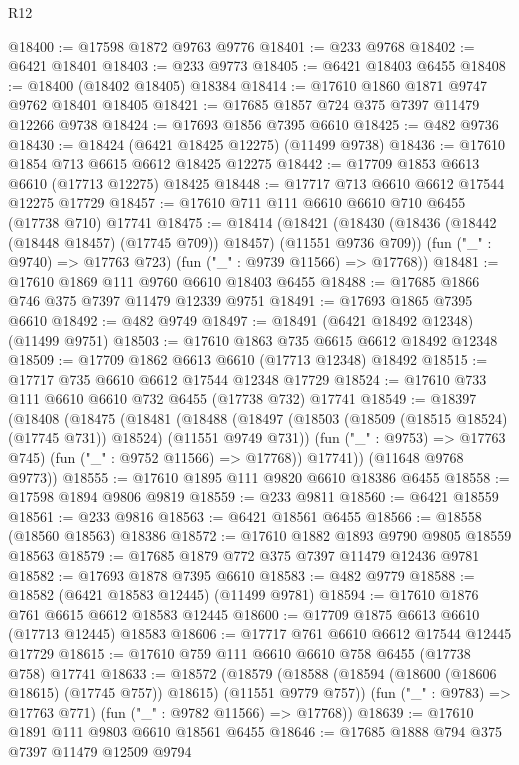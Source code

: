 \begin{lexlean}{R12}
\begin{coremodule}
{{{{{{{{{{{{{{{{{{{{{{{{{{{{{{{{{{{{{{{{{{{{{{{{{{{{{{{{{{{{{{{{{{{{{{{{{{{{{{{{{{@18400 := @17598 @1872 @9763 @9776
@18401 := @233 @9768
@18402 := @6421 @18401
@18403 := @233 @9773
@18405 := @6421 @18403 @6455
@18408 := @18400 (@18402 @18405) @18384
@18414 := @17610 @1860 @1871 @9747 @9762 @18401 @18405
@18421 := @17685 @1857 @724 @375 @7397 @11479 @12266 @9738
@18424 := @17693 @1856 @7395 @6610
@18425 := @482 @9736
@18430 := @18424 (@6421 @18425 @12275) (@11499 @9738)
@18436 := @17610 @1854 @713 @6615 @6612 @18425 @12275
@18442 := @17709 @1853 @6613 @6610 (@17713 @12275) @18425
@18448 := @17717 @713 @6610 @6612 @17544 @12275 @17729
@18457 := @17610 @711 @111 @6610 @6610 @710 @6455 (@17738 @710) @17741
@18475 := @18414
    (@18421
      (@18430 (@18436 (@18442 (@18448 @18457) (@17745 @709)) @18457) (@11551 @9736 @709))
      (fun ("_" : @9740) => @17763 @723)
      (fun ("_" : @9739 @11566) => @17768))
@18481 := @17610 @1869 @111 @9760 @6610 @18403 @6455
@18488 := @17685 @1866 @746 @375 @7397 @11479 @12339 @9751
@18491 := @17693 @1865 @7395 @6610
@18492 := @482 @9749
@18497 := @18491 (@6421 @18492 @12348) (@11499 @9751)
@18503 := @17610 @1863 @735 @6615 @6612 @18492 @12348
@18509 := @17709 @1862 @6613 @6610 (@17713 @12348) @18492
@18515 := @17717 @735 @6610 @6612 @17544 @12348 @17729
@18524 := @17610 @733 @111 @6610 @6610 @732 @6455 (@17738 @732) @17741
@18549 := @18397
    (@18408
      (@18475
        (@18481
          (@18488
            (@18497 (@18503 (@18509 (@18515 @18524) (@17745 @731)) @18524) (@11551 @9749 @731))
            (fun ("_" : @9753) => @17763 @745)
            (fun ("_" : @9752 @11566) => @17768))
          @17741))
      (@11648 @9768 @9773))
@18555 := @17610 @1895 @111 @9820 @6610 @18386 @6455
@18558 := @17598 @1894 @9806 @9819
@18559 := @233 @9811
@18560 := @6421 @18559
@18561 := @233 @9816
@18563 := @6421 @18561 @6455
@18566 := @18558 (@18560 @18563) @18386
@18572 := @17610 @1882 @1893 @9790 @9805 @18559 @18563
@18579 := @17685 @1879 @772 @375 @7397 @11479 @12436 @9781
@18582 := @17693 @1878 @7395 @6610
@18583 := @482 @9779
@18588 := @18582 (@6421 @18583 @12445) (@11499 @9781)
@18594 := @17610 @1876 @761 @6615 @6612 @18583 @12445
@18600 := @17709 @1875 @6613 @6610 (@17713 @12445) @18583
@18606 := @17717 @761 @6610 @6612 @17544 @12445 @17729
@18615 := @17610 @759 @111 @6610 @6610 @758 @6455 (@17738 @758) @17741
@18633 := @18572
    (@18579
      (@18588 (@18594 (@18600 (@18606 @18615) (@17745 @757)) @18615) (@11551 @9779 @757))
      (fun ("_" : @9783) => @17763 @771)
      (fun ("_" : @9782 @11566) => @17768))
@18639 := @17610 @1891 @111 @9803 @6610 @18561 @6455
@18646 := @17685 @1888 @794 @375 @7397 @11479 @12509 @9794
}}}}}}}}}}}}}}}}}}}}}}}}}}}}}}}}}}}}}}}}}}}}}}}}}}}}}}}}}}}}}}}}}}}}}}}}}}}}}}}}}}
\end{coremodule}
\end{lexlean}
